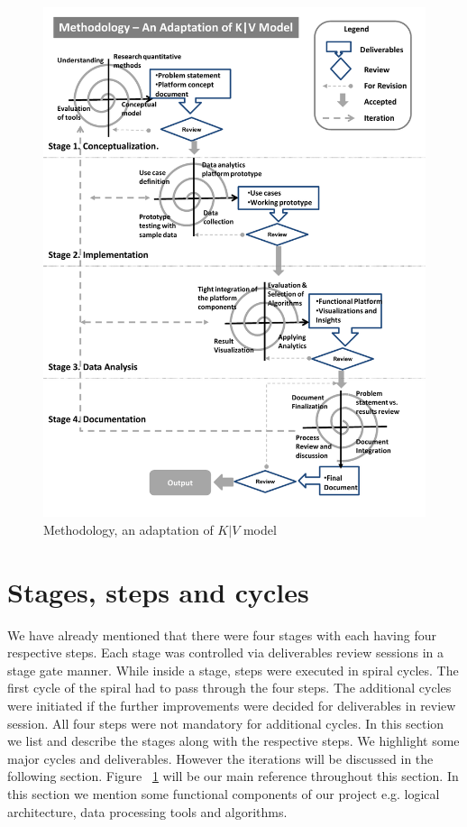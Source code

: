  \begin{figure}[!h]
   \begin{center}
     \includegraphics[width=\textwidth]{images/kv_method.pdf}
     \caption{Methodology, an adaptation of \(K|V\) model}
     \label{fig:kv}
   \end{center}
 \end{figure} 
\section{Stages, steps and cycles}\label{stages} 
We have already mentioned that there were four stages with each having four respective steps. Each stage was controlled via deliverables review sessions in a stage gate manner. While inside a stage, steps were executed in spiral cycles. The first cycle of the spiral had to pass through the four steps. The additional cycles were initiated if the further improvements were decided for deliverables in review session. All four steps were not mandatory for additional cycles. In this section we list and describe the stages along with the respective steps. We highlight some major cycles and deliverables. However the iterations will be discussed in the following section. Figure ~\ref{fig:kv} will be our main reference throughout this section. In this section we mention some functional components of our project e.g. logical architecture, data processing tools and algorithms. 
